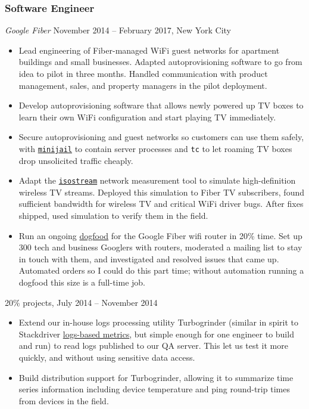 \documentclass[]{rss}
\date{}
\begin{document}
\address{\\[-9pt] will@willangley.org}
\begin{resume}

\subsubsection{Software Engineer}\label{software-engineer}

\emph{Google Fiber} November 2014 -- February 2017, New York City

\begin{itemize}
\item
  Lead engineering of Fiber-managed WiFi guest networks for apartment
  buildings and small businesses. Adapted autoprovisioning software to
  go from idea to pilot in three months. Handled communication with
  product management, sales, and property managers in the pilot
  deployment.
\item
  Develop autoprovisioning software that allows newly powered up TV
  boxes to learn their own WiFi configuration and start playing TV
  immediately.
\item
  Secure autoprovisioning and guest networks so customers can use them
  safely, with
  \href{https://www.chromium.org/chromium-os/developer-guide/chromium-os-sandboxing}{\texttt{minijail}}
  to contain server processes and \texttt{tc} to let roaming TV boxes
  drop unsolicited traffic cheaply.
\item
  Adapt the
  \href{https://gfiber.googlesource.com/vendor/google/platform/+/master/cmds/isostream.c}{\texttt{isostream}}
  network measurement tool to simulate high-definition wireless TV
  streams. Deployed this simulation to Fiber TV subscribers, found
  sufficient bandwidth for wireless TV and critical WiFi driver bugs.
  After fixes shipped, used simulation to verify them in the field.
\item
  Run an ongoing
  \href{https://blog.codinghorror.com/the-ultimate-dogfooding-story/}{dogfood}
  for the Google Fiber wifi router in 20\% time. Set up 300 tech and
  business Googlers with routers, moderated a mailing list to stay in
  touch with them, and investigated and resolved issues that came up.
  Automated orders so I could do this part time; without automation
  running a dogfood this size is a full-time job.
\end{itemize}

20\% projects, July 2014 -- November 2014

\begin{itemize}
\item
  Extend our in-house logs processing utility Turbogrinder (similar in
  spirit to Stackdriver
  \href{https://cloud.google.com/logging/docs/view/logs_based_metrics}{logs-based
  metrics}, but simple enough for one engineer to build and run) to read
  logs published to our QA server. This let us test it more quickly, and
  without using sensitive data access.
\item
  Build distribution support for Turbogrinder, allowing it to summarize
  time series information including device temperature and ping
  round-trip times from devices in the field.
\end{itemize}


\end{resume}
\end{document}
